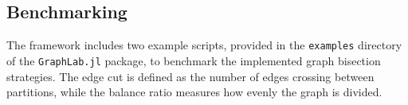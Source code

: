 \documentclass[../paper.tex]{subfiles}
\begin{document}
    

    \subsection{Benchmarking}
    \label{subsec:bench}
    
    The framework includes two example scripts, provided in the \texttt{examples} directory of the \texttt{GraphLab.jl} package, to benchmark the implemented graph bisection strategies. The edge cut is defined as the number of edges crossing between partitions, while the balance ratio measures how evenly the graph is divided.
    
\end{document}
